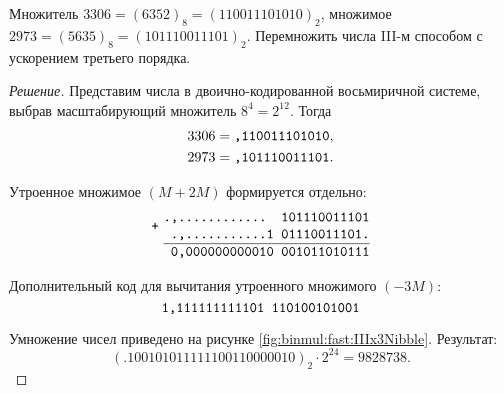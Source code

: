 \begin{Example}\label{ex:binmul:fast:IIIx3Nibble}
    Множитель $3306=(6352)_8=(110011101010)_2$, множимое $2973=(5635)_8=(101110011101)_2$. Перемножить числа III-м способом с ускорением третьего порядка.
\end{Example}
\begin{proof}[Решение]
    Представим числа в двоично-кодированной восьмиричной системе, выбрав масштабирующий множитель $8^4=2^{12}$. Тогда 
    \begin{align*}
        3306=\texttt{,110011101010},\\
        2973=\texttt{,101110011101}.
    \end{align*}

    Утроенное множимое $(M+2M)$ формируется отдельно:
    \[
        \Addition{.,............ 101110011101}
                 {.,...........1 01110011101.}
                 {0,000000000010 001011010111}
    \]

    Дополнительный код для вычитания утроенного множимого $(-3M)$:
    \[
        \texttt{1,111111111101 110100101001}
    \]
        
    Умножение чисел приведено на рисунке \ref{fig:binmul:fast:IIIx3Nibble}. Результат: 
    \[
        (.100101011111 100110000010)_2\cdot 2^{24}=9828738.
    \]
\end{proof}

